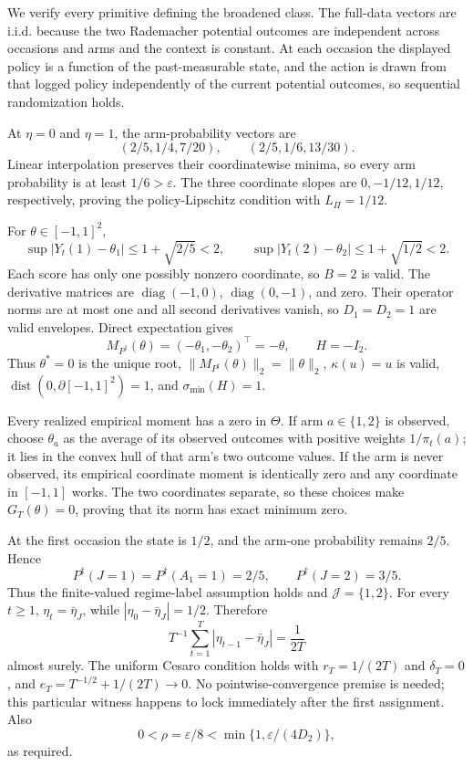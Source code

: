 We verify every primitive defining the broadened class. The full-data vectors are i.i.d. because the two Rademacher potential outcomes are independent across occasions and arms and the context is constant. At each occasion the displayed policy is a function of the past-measurable state, and the action is drawn from that logged policy independently of the current potential outcomes, so sequential randomization holds.

At \(\eta=0\) and \(\eta=1\), the arm-probability vectors are
\[
 (2/5,1/4,7/20),\qquad(2/5,1/6,13/30).
\]
Linear interpolation preserves their coordinatewise minima, so every arm probability is at least \(1/6>\varepsilon\). The three coordinate slopes are \(0,-1/12,1/12\), respectively, proving the policy-Lipschitz condition with \(L_\Pi=1/12\).

For \(\theta\in[-1,1]^2\),
\[
 \sup|Y_t(1)-\theta_1|\le1+\sqrt{2/5}<2,
 \qquad
 \sup|Y_t(2)-\theta_2|\le1+\sqrt{1/2}<2.
\]
Each score has only one possibly nonzero coordinate, so \(B=2\) is valid. The derivative matrices are \(\operatorname{diag}(-1,0)\), \(\operatorname{diag}(0,-1)\), and zero. Their operator norms are at most one and all second derivatives vanish, so \(D_1=D_2=1\) are valid envelopes. Direct expectation gives
\[
 M_{P^\dagger}(\theta)=(-\theta_1,-\theta_2)^\top=-\theta,
 \qquad H=-I_2.
\]
Thus \(\theta^*=0\) is the unique root, \(\|M_{P^\dagger}(\theta)\|_2=\|\theta\|_2\), \(\kappa(u)=u\) is valid, \(\operatorname{dist}(0,\partial[-1,1]^2)=1\), and \(\sigma_{\min}(H)=1\).

Every realized empirical moment has a zero in \(\Theta\). If arm \(a\in\{1,2\}\) is observed, choose \(\theta_a\) as the average of its observed outcomes with positive weights \(1/\pi_t(a)\); it lies in the convex hull of that arm's two outcome values. If the arm is never observed, its empirical coordinate moment is identically zero and any coordinate in \([-1,1]\) works. The two coordinates separate, so these choices make \(G_T(\theta)=0\), proving that its norm has exact minimum zero.

At the first occasion the state is \(1/2\), and the arm-one probability remains \(2/5\). Hence
\[
 P^\dagger(J=1)=P^\dagger(A_1=1)=2/5,
 \qquad P^\dagger(J=2)=3/5.
\]
Thus the finite-valued regime-label assumption holds and \(\mathcal J=\{1,2\}\). For every \(t\ge1\), \(\eta_t=\bar\eta_J\), while \(|\eta_0-\bar\eta_J|=1/2\). Therefore
\[
 T^{-1}\sum_{t=1}^T|\eta_{t-1}-\bar\eta_J|=\frac1{2T}
\]
almost surely. The uniform Cesaro condition holds with \(r_T=1/(2T)\) and \(\delta_T=0\), and \(e_T=T^{-1/2}+1/(2T)\to0\). No pointwise-convergence premise is needed; this particular witness happens to lock immediately after the first assignment. Also
\[
 0<\rho=\varepsilon/8<\min\{1,\varepsilon/(4D_2)\},
\]
as required.

